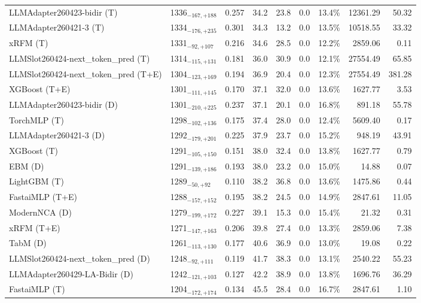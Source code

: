 \begin{tabular}{llcccccrr}
LLMAdapter260423-bidir (T) & 1336${}_{-167,+188}$ & 0.257 & 34.2 & 23.8 & 0.0 & 13.4\% & 12361.29 & 50.32 \\
LLMAdapter260421-3 (T) & 1334${}_{-176,+235}$ & 0.301 & 34.3 & 13.2 & 0.0 & 13.5\% & 10518.55 & 33.32 \\
xRFM (T) & 1331${}_{-92,+107}$ & 0.216 & 34.6 & 28.5 & 0.0 & 12.2\% & 2859.06 & 0.11 \\
LLMSlot260424-next_token_pred (T) & 1314${}_{-115,+131}$ & 0.181 & 36.0 & 30.9 & 0.0 & 12.1\% & 27554.49 & 65.85 \\
LLMSlot260424-next_token_pred (T+E) & 1304${}_{-123,+169}$ & 0.194 & 36.9 & 20.4 & 0.0 & 12.3\% & 27554.49 & 381.28 \\
XGBoost (T+E) & 1301${}_{-111,+145}$ & 0.170 & 37.1 & 32.0 & 0.0 & 13.6\% & 1627.77 & 3.53 \\
LLMAdapter260423-bidir (D) & 1301${}_{-210,+225}$ & 0.237 & 37.1 & 20.1 & 0.0 & 16.8\% & 891.18 & 55.78 \\
TorchMLP (T) & 1298${}_{-102,+136}$ & 0.175 & 37.4 & 28.0 & 0.0 & 12.4\% & 5609.40 & 0.17 \\
LLMAdapter260421-3 (D) & 1292${}_{-179,+201}$ & 0.225 & 37.9 & 23.7 & 0.0 & 15.2\% & 948.19 & 43.91 \\
XGBoost (T) & 1291${}_{-105,+150}$ & 0.151 & 38.0 & 32.4 & 0.0 & 13.8\% & 1627.77 & 0.79 \\
EBM (D) & 1291${}_{-139,+186}$ & 0.193 & 38.0 & 23.2 & 0.0 & 15.0\% & 14.88 & 0.07 \\
LightGBM (T) & 1289${}_{-50,+92}$ & 0.110 & 38.2 & 36.8 & 0.0 & 13.6\% & 1475.86 & 0.44 \\
FastaiMLP (T+E) & 1288${}_{-157,+152}$ & 0.195 & 38.2 & 24.5 & 0.0 & 14.9\% & 2847.61 & 11.05 \\
ModernNCA (D) & 1279${}_{-199,+172}$ & 0.227 & 39.1 & 15.3 & 0.0 & 15.4\% & 21.32 & 0.31 \\
xRFM (T+E) & 1271${}_{-147,+163}$ & 0.206 & 39.8 & 27.4 & 0.0 & 13.3\% & 2859.06 & 7.38 \\
TabM (D) & 1261${}_{-113,+130}$ & 0.177 & 40.6 & 36.9 & 0.0 & 13.0\% & 19.08 & 0.22 \\
LLMSlot260424-next_token_pred (D) & 1248${}_{-92,+111}$ & 0.119 & 41.7 & 38.3 & 0.0 & 13.1\% & 2540.22 & 55.23 \\
LLMAdapter260429-LA-Bidir (D) & 1242${}_{-121,+103}$ & 0.127 & 42.2 & 38.9 & 0.0 & 13.8\% & 1696.76 & 36.29 \\
FastaiMLP (T) & 1204${}_{-172,+174}$ & 0.134 & 45.5 & 28.4 & 0.0 & 16.7\% & 2847.61 & 1.10 \\

\end{tabular}
